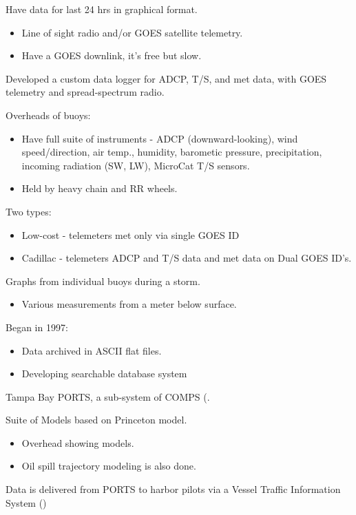 Have data for last 24 hrs in graphical format.
\begin{itemize}
\item Line of sight radio and/or GOES satellite telemetry.
\item Have a GOES downlink, it's free but slow.
\end{itemize}

Developed a custom data logger for ADCP, T/S, and met data, with GOES
telemetry and spread-spectrum radio.

Overheads of buoys:
\begin{itemize}
\item Have full suite of instruments - ADCP (downward-looking), wind
  speed/direction, air temp., humidity, barometic pressure,
  precipitation, incoming radiation (SW, LW), MicroCat T/S sensors.
\item Held by heavy chain and RR wheels.
\end{itemize}

Two types:
\begin{itemize}
\item Low-cost - telemeters met only via single GOES ID
\item Cadillac - telemeters ADCP and T/S data and met data on Dual GOES ID's.
\end{itemize}

Graphs from individual buoys during a storm.
\begin{itemize}
\item Various measurements from a meter below surface.
\end{itemize}

Began in 1997:
\begin{itemize}
\item Data archived in ASCII flat files.
\item Developing searchable database system
\end{itemize}

Tampa Bay PORTS, a sub-system of COMPS (.

Suite of Models based on Princeton model.
\begin{itemize}
\item Overhead showing models.
\item Oil spill trajectory modeling is also done.
\end{itemize}

Data is delivered from PORTS to harbor pilots via a Vessel Traffic Information System 
()

